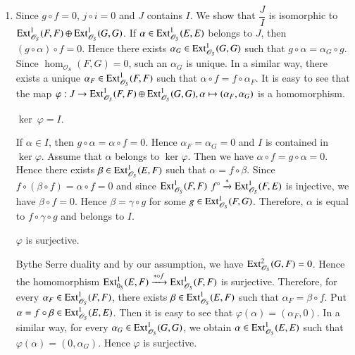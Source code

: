 \begin{Proof}
\begin{enumerate}
\renewcommand{\labelenumi}{(\theenumi)}
\item Since $g\circ f=0$, $j\circ i=0$ and $J$ contains $I$. We show
that $\dfrac{J}{I}$ is isomorphic to
$\mathrm{Ext}^{1}_{\mathscr{O}_S}(F,F)\oplus \mathrm{Ext}^{1}_{\mathscr{O}_S}(G,G)$. If
$\alpha \in \mathrm{Ext}^{1}_{\mathscr{O}_S}(E,E)$ belongs to $J$, then
$(g\circ \alpha)\circ f=0$. Hence there exists
$\alpha_G\in \mathrm{Ext}^{1}_{\mathscr{O}_S}(G,G)$ such that
$g\circ \alpha=\alpha_G\circ g$. Since $\hom_{\mathscr{O}_S}(F,G)=0$,
such an $\alpha_G$ is unique. In a similar way, there exists a unique
$\alpha_F\in \mathrm{Ext}^{1}_{\mathscr{O}_S}(F,F)$ such that $\alpha\circ
f=f\circ \alpha_F$. It is easy to see that the map
$\varphi:J\to \mathrm{Ext}^{1}_{\mathscr{O}_S}(F,F)\oplus \mathrm{Ext}^{1}_{\mathscr{O}_S}(G,G), \alpha \mapsto
(\alpha_F,\alpha_G)$ is a homomorphism.

\begin{claim}
$\ker \ \varphi=I$.
\end{claim}

If $\alpha\in I$, then $g\circ \alpha=\alpha\circ f=0$. Hence
$\alpha_F=\alpha_G=0$ and $I$ is contained in $\ker \varphi$. Assume
that $\alpha$ belongs to $\ker \varphi$. Then we have $\alpha\circ
f=g\circ \alpha=0$. Hence there exists
$\beta \in \mathrm{Ext}^{1}_{\mathscr{O}_S}(E,F)$ such that
$\alpha=f\circ \beta$. Since $f\circ (\beta \circ f)=\alpha\circ f=0$
and since $\mathrm{Ext}^{1}_{\mathscr{O}_S}(F,F)$
$f^{\circ}\xrightarrow{\ast}\mathrm{Ext}^{1}_{\mathscr{O}_S}(F,E)$ is injective,
we have $\beta\circ f=0$. Hence $\beta=\gamma\circ g$ for some
$g\in \mathrm{Ext}^{1}_{\mathscr{O}_S}(F,G)$. Therefore, $\alpha$ is equal to
$f\circ \gamma\circ g$ and belongs to $I$. 

\begin{claim}
$\varphi$ is surjective.
\end{claim}

By\pageoriginale the Serre duality and by our assumption, we have
$\mathrm{Ext}^{2}_{\mathscr{O}_S}\\(G,F)=0$. Hence the homomorphism
$\mathrm{Ext}^{1}_{0_S}(E,F)\xrightarrow{\ast \circ
f}\\\mathrm{Ext}^{1}_{\mathscr{O}_S}(F,F)$ is surjective. Therefore, for every
$\alpha_F \in \mathrm{Ext}^{1}_{\mathscr{O}_S}(F,F)$, there exists
$\beta \in \mathrm{Ext}^{1}_{\mathscr{O}_S}(E,F)$ such that
$\alpha_F=\beta\circ f$. Put $\alpha=f\circ \beta \in
\mathrm{Ext}^{1}_{\mathscr{O}_S}(E,E)$. Then it is easy to see that
$\varphi(\alpha)=(\alpha_F,0)$. In a similar way, for every
$\alpha_G\in \mathrm{Ext}^{1}_{\mathscr{O}_S}(G,G)$, we obtain
$\alpha\in \mathrm{Ext}^{1}_{\mathscr{O}_S}(E,E)$ such that
$\varphi(\alpha)=(0,\alpha_G)$. Hence $\varphi$ is surjective.


\end{enumerate}
\end{Proof}

